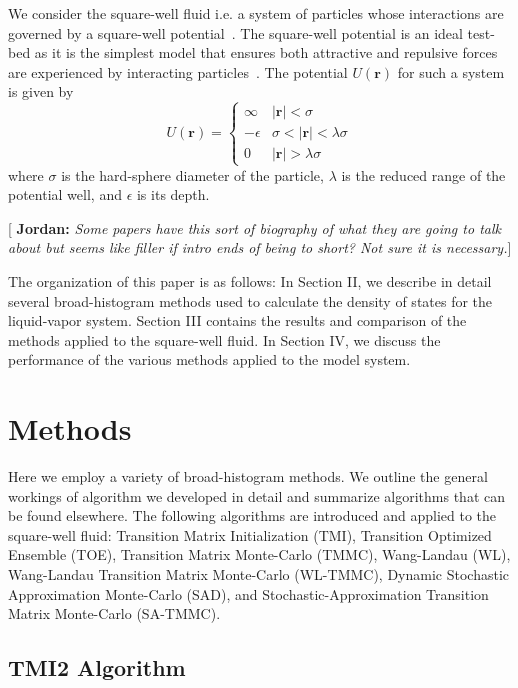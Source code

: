 \documentclass[letterpaper,twocolumn,amsmath,amssymb,pre,aps,10pt]{revtex4-1}
\newcommand{\blue}[1]{{\bf \color{blue} #1}}
\newcommand{\jpsays}[1]{{\color{red} [\blue{Jordan:} \emph{#1}]}}
\begin{document}
We consider the square-well fluid i.e. a system of particles whose interactions are governed by a square-well potential~\cite{singh2003surface, barker2004perturbationSW}.  The square-well potential is an ideal test-bed as it is the simplest model that ensures both attractive and repulsive forces are experienced by interacting particles~\cite{barker1967-SW-perturbation, vega1992phase}.  The potential $U(\textbf{r})$ for such a system is given by
\begin{equation}
 U(\textbf{r})=\begin{cases} \infty & 
 \lvert\textbf{r}\rvert< \sigma\\-\epsilon & 
 \sigma<\lvert\textbf{r}\rvert<\lambda\sigma\\0 & 
 \lvert\textbf{r}\rvert > \lambda\sigma\end{cases}
\end{equation}
where $\sigma$ is the hard-sphere diameter of the particle, $\lambda$ is the
reduced range of the potential well, and $\epsilon$ is its depth.

\jpsays{Some papers have this sort of biography of what they are going to talk about but seems like filler if intro ends of being to short?  Not sure it is necessary.}

The organization of this paper is as follows: In Section II, we describe in detail several broad-histogram methods used to calculate the density of states for the liquid-vapor system.  Section III contains the results and comparison of the methods applied to the square-well fluid.  In Section IV, we discuss the performance of the various methods applied to the model system. 


\section{Methods}

Here we employ a variety of broad-histogram methods.  We outline the general workings of algorithm we developed in detail and summarize algorithms that can be found elsewhere.  The following algorithms are introduced and applied to the square-well fluid: Transition Matrix Initialization (TMI), Transition Optimized Ensemble (TOE), Transition Matrix Monte-Carlo (TMMC), Wang-Landau (WL), Wang-Landau Transition Matrix Monte-Carlo (WL-TMMC), Dynamic Stochastic Approximation Monte-Carlo (SAD), and Stochastic-Approximation Transition Matrix Monte-Carlo (SA-TMMC).

\subsection{TMI2 Algorithm}
\end{document}
